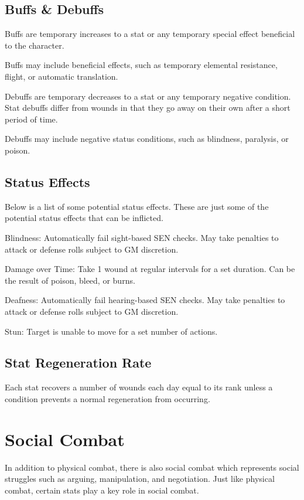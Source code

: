 \begin{multicols}{2}
\subsection{Buffs \& Debuffs}
Buffs are temporary increases to a stat or any temporary special effect beneficial to the character. 

Buffs may include beneficial effects, such as temporary elemental resistance, flight, or automatic translation.

Debuffs are temporary decreases to a stat or any temporary negative condition. Stat debuffs differ from wounds in that they go away on their own after a short period of time.

Debuffs may include negative status conditions, such as blindness, paralysis, or poison.

\subsection{Status Effects}
Below is a list of some potential status effects. These are just some of the potential status effects that can be inflicted.
\begin{wldescription}
\item [Blindness:] Automatically fail sight-based SEN checks. May take penalties to attack or defense rolls subject to GM discretion.
\item [Damage over Time:]  Take 1 wound at regular intervals for a set duration. Can be the result of poison, bleed, or burns.
\item [Deafness:]  Automatically fail hearing-based SEN checks. May take penalties to attack or defense rolls subject to GM discretion.
\item [Stun:] Target is unable to move for a set number of actions.
\end{wldescription}

\subsection{Stat Regeneration Rate}
Each stat recovers a number of wounds each day equal to its rank unless a condition prevents a normal regeneration from occurring.

\section{Social Combat}

In addition to physical combat, there is also social combat which represents social struggles such as arguing, manipulation, and negotiation. Just like physical combat, certain stats play a key role in social combat.


\end{multicols}
